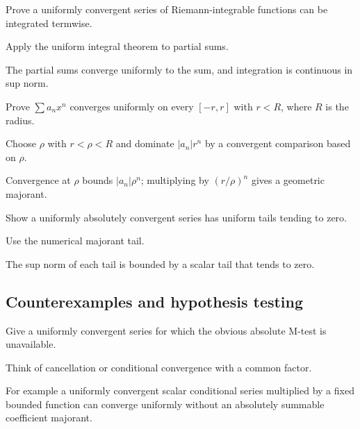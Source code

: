 \begin{exercise}\label{exr:ii13-expand-07}
Prove a uniformly convergent series of Riemann-integrable functions can be integrated termwise.
\end{exercise}
\begin{hint}
Apply the uniform integral theorem to partial sums.
\end{hint}
\begin{solution}
The partial sums converge uniformly to the sum, and integration is continuous in sup norm.
\end{solution}

\begin{exercise}\label{exr:ii13-expand-08}
Prove \(\sum a_nx^n\) converges uniformly on every \([-r,r]\) with \(r<R\), where \(R\) is the radius.
\end{exercise}
\begin{hint}
Choose \(\rho\) with \(r<\rho<R\) and dominate \(|a_n|r^n\) by a convergent comparison based on \(\rho\).
\end{hint}
\begin{solution}
Convergence at \(\rho\) bounds \(|a_n|\rho^n\); multiplying by \((r/\rho)^n\) gives a geometric majorant.
\end{solution}

\begin{exercise}\label{exr:ii13-expand-09}
Show a uniformly absolutely convergent series has uniform tails tending to zero.
\end{exercise}
\begin{hint}
Use the numerical majorant tail.
\end{hint}
\begin{solution}
The sup norm of each tail is bounded by a scalar tail that tends to zero.
\end{solution}

\subsection*{Counterexamples and hypothesis testing}

\begin{exercise}\label{exr:ii13-expand-10}
Give a uniformly convergent series for which the obvious absolute M-test is unavailable.
\end{exercise}
\begin{hint}
Think of cancellation or conditional convergence with a common factor.
\end{hint}
\begin{solution}
For example a uniformly convergent scalar conditional series multiplied by a fixed bounded function can converge uniformly without an absolutely summable coefficient majorant.
\end{solution}

